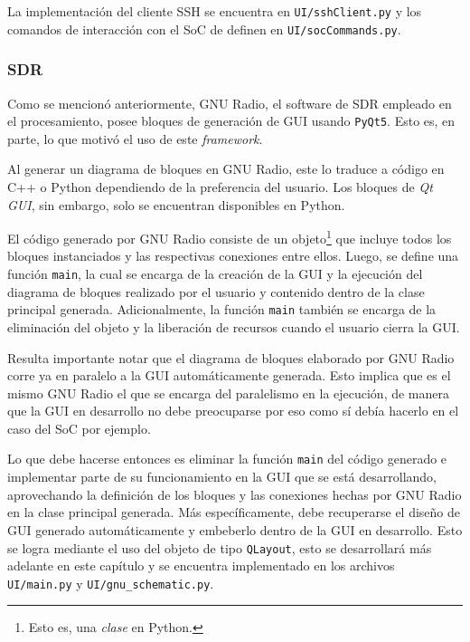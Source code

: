 \documentclass[../../main.tex]{subfiles}
\begin{document}
La implementación del cliente SSH se encuentra en \texttt{UI/sshClient.py} y los comandos de interacción con el SoC de definen en \texttt{UI/socCommands.py}. 

\subsubsection{SDR}
Como se mencionó anteriormente, GNU Radio, el software de SDR empleado en el procesamiento, posee bloques de generación de GUI usando \texttt{PyQt5}. Esto es, en parte, lo que motivó el uso de este \textit{framework}. 

Al generar un diagrama de bloques en GNU Radio, este lo traduce a código en C++ o Python dependiendo de la preferencia del usuario. Los bloques de \textit{Qt GUI}, sin embargo, solo se encuentran disponibles en Python. 

El código generado por GNU Radio consiste de un objeto\footnote{Esto es, una \textit{clase} en Python.} que incluye todos los bloques instanciados y las respectivas conexiones entre ellos. Luego, se define una función \texttt{main}, la cual se encarga de la creación de la GUI y la ejecución del diagrama de bloques realizado por el usuario y contenido dentro de la clase principal generada. Adicionalmente, la función \texttt{main} también se encarga de la eliminación del objeto y la liberación de recursos cuando el usuario cierra la GUI.

Resulta importante notar que el diagrama de bloques elaborado por GNU Radio corre ya en paralelo a la GUI automáticamente generada. Esto implica que es el mismo GNU Radio el que se encarga del paralelismo en la ejecución, de manera que la GUI en desarrollo no debe preocuparse por eso como sí debía hacerlo en el caso del SoC por ejemplo.

Lo que debe hacerse entonces es eliminar la función \texttt{main} del código generado e implementar parte de su funcionamiento en la GUI que se está desarrollando, aprovechando la definición de los bloques y las conexiones hechas por GNU Radio en la clase principal generada. 
Más específicamente, debe recuperarse el diseño de GUI generado automáticamente y embeberlo dentro de la GUI en desarrollo. Esto se logra mediante el uso del objeto de tipo \texttt{QLayout}, esto se desarrollará más adelante en este capítulo y se encuentra implementado en los archivos \texttt{UI/main.py} y \texttt{UI/gnu\_schematic.py}.  
\end{document}

